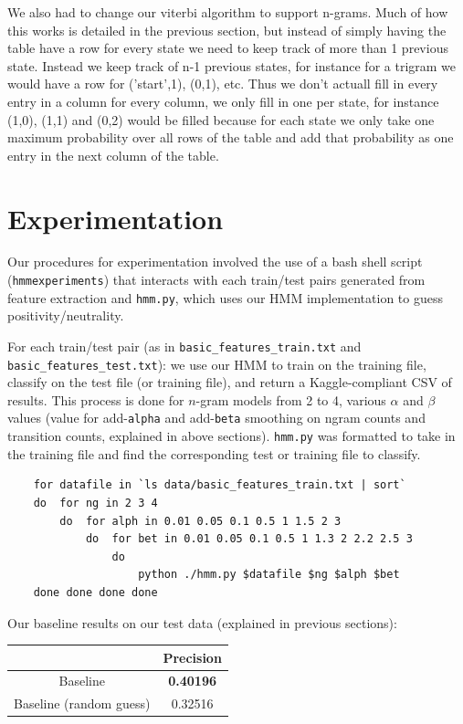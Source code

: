 \documentclass{article}
\begin{document}
We also had to change our viterbi algorithm to support n-grams. Much of how this works is detailed in the previous section, but instead of simply having the table have a row for every state we need to keep track of more than 1 previous state. Instead we keep track of n-1 previous states, for instance for a trigram we would have a row for ('start',1), (0,1), etc. Thus we don't actuall fill in every entry in a column for every column, we only fill in one per state, for instance (1,0), (1,1) and (0,2) would be filled because for each state we only take one maximum probability over all rows of the table and add that probability as one entry in the next column of the table.

\section{Experimentation}

Our procedures for experimentation involved the use of a bash shell script (\texttt{hmmexperiments}) that interacts with each train/test pairs generated from feature extraction and \texttt{hmm.py}, which uses our HMM implementation to guess positivity/neutrality.\par

For each train/test pair (as in \texttt{basic\_features\_train.txt} and \texttt{basic\_features\_test.txt}): we use our HMM to train on the training file, classify on the test file (or training file), and return a Kaggle-compliant CSV of results. This process is done for $n$-gram models from 2 to 4, various $\alpha$ and $\beta$ values (value for add-\texttt{alpha} and add-\texttt{beta} smoothing on ngram counts and transition counts, explained in above sections). \texttt{hmm.py} was formatted to take in the training file and find the corresponding test or training file to classify.\par

\begin{verbatim}
    for datafile in `ls data/basic_features_train.txt | sort`
    do  for ng in 2 3 4
        do  for alph in 0.01 0.05 0.1 0.5 1 1.5 2 3
            do  for bet in 0.01 0.05 0.1 0.5 1 1.3 2 2.2 2.5 3
                do
                    python ./hmm.py $datafile $ng $alph $bet
    done done done done
\end{verbatim}

Our baseline results on our test data (explained in previous sections):\par\medskip
\begin{tabular}{|c|c|}\hline
                        & Precision\\\hline
Baseline                & \textbf{0.40196}\\
Baseline (random guess) & 0.32516\\\hline
\end{tabular}\par\medskip
\end{document}
